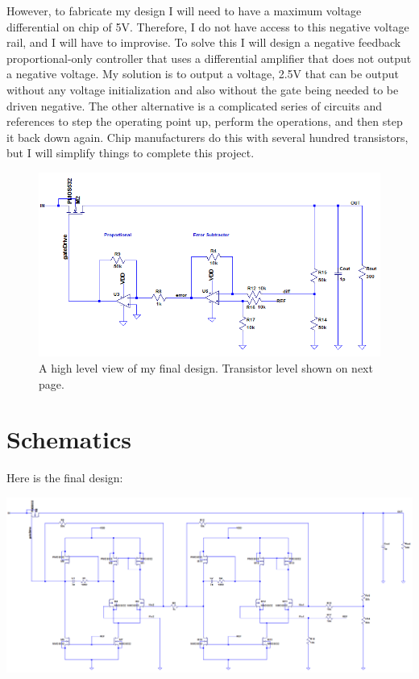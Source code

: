 \documentclass[10pt]{amsart}
\begin{document}
However, to fabricate my design I will need to have a maximum voltage differential on chip of 5V. Therefore, I do not have access to this negative voltage rail, and I will have to improvise. To solve this I will design a negative feedback proportional-only controller that uses a differential amplifier that does not output a negative voltage. My solution is to output a voltage, 2.5V that can be output without any voltage initialization and also without the gate being needed to be driven negative. The other alternative is a complicated series of circuits and references to step the operating point up, perform the operations, and then step it back down again. Chip manufacturers do this with several hundred transistors, but I will simplify things to complete this project.

\begin{figure}[h]
	\begin{center}
		\includegraphics[width=7in]{Media/cleanfinal.png}
	\end{center}
	\caption{A high level view of my final design. Transistor level shown on next page.}
	\label{fig:pidfb}
\end{figure}

\newpage

\section{Schematics}

Here is the final design:
	\begin{center}
		\includegraphics[width=7.0in, angle=90]{Media/design.png}
	\end{center}
\end{document}
